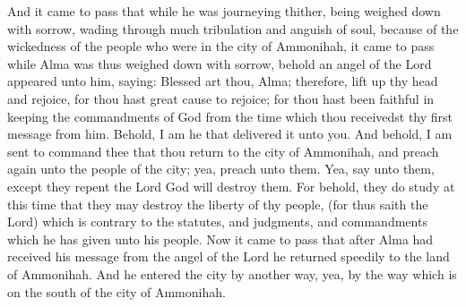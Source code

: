 \bverse \iffalse And it came to pass that while he was journeying thither, being weighed down with sorrow, wading through much tribulation and anguish of soul, because of the wickedness of the people who were in the city of Ammonihah, it came to pass while Alma was thus weighed down with sorrow, behold an angel of the Lord appeared unto him, saying: \fi
And it came to pass that while he was journeying thither, being weighed down with sorrow, wading through much tribulation and anguish of soul, because of the wickedness of the people who were in the city of Ammonihah, it came to pass while Alma was thus weighed down with sorrow, behold an angel of the Lord appeared unto him, saying:
\bverse \iffalse Blessed art thou, Alma; therefore, lift up thy head and rejoice, for thou hast great cause to rejoice; for thou hast been faithful in keeping the commandments of God from the time which thou receivedst thy first message from him. Behold, I am he that delivered it unto you. \fi
Blessed art thou, Alma; therefore, lift up thy head and rejoice, for thou hast great cause to rejoice; for thou hast been faithful in keeping the commandments of God from the time which thou receivedst thy first message from him. Behold, I am he that delivered it unto you.
\bverse \iffalse And behold, I am sent to command thee that thou return to the city of Ammonihah, and preach again unto the people of the city; yea, preach unto them. Yea, say unto them, except they repent the Lord God will destroy them. \fi
And behold, I am sent to command thee that thou return to the city of Ammonihah, and preach again unto the people of the city; yea, preach unto them. Yea, say unto them, except they repent the Lord God will destroy them.
\bverse \iffalse For behold, they do study at this time that they may destroy the liberty of thy people, (for thus saith the Lord) which is contrary to the statutes, and judgments, and commandments which he has given unto his people. \fi
For behold, they do study at this time that they may destroy the liberty of thy people, (for thus saith the Lord) which is contrary to the statutes, and judgments, and commandments which he has given unto his people.
\bverse \iffalse Now it came to pass that after Alma had received his message from the angel of the Lord he returned speedily to the land of Ammonihah. And he entered the city by another way, yea, by the way which is on the south of the city of Ammonihah. \fi
Now it came to pass that after Alma had received his message from the angel of the Lord he returned speedily to the land of Ammonihah. And he entered the city by another way, yea, by the way which is on the south of the city of Ammonihah.
